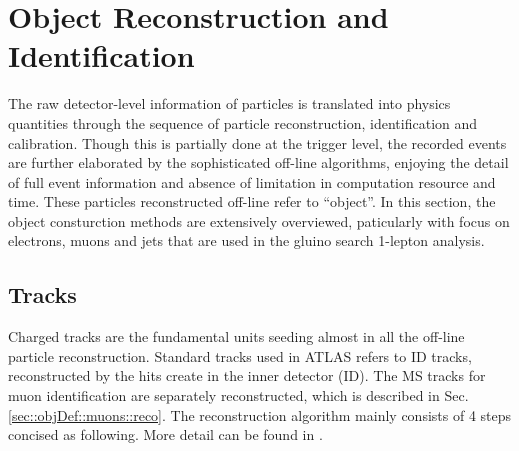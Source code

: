 \section{Object Reconstruction and Identification}  \label{sec::objDef}
The raw detector-level information of particles is translated into physics quantities through the sequence of particle reconstruction, identification and calibration.
Though this is partially done at the trigger level, the recorded events are further elaborated by the sophisticated off-line algorithms, enjoying the detail of full event information and absence of limitation in computation resource and time.
These particles reconstructed off-line refer to ``object''. In this section, the object consturction methods are extensively overviewed, paticularly with focus on electrons, muons and jets that are used in the gluino search 1-lepton analysis.



\subsection{Tracks} \label{sec::objDef::tracks}
Charged tracks are the fundamental units seeding almost in all the off-line particle reconstruction. 
Standard tracks used in ATLAS refers to ID tracks, reconstructed by the hits create in the inner detector (ID).
The MS tracks for muon identification are separately reconstructed, which is described in Sec. \ref{sec::objDef::muons::reco}.
The reconstruction algorithm mainly consists of 4 steps concised as following. 
More detail can be found in \cite{130_trackingRun2}.


